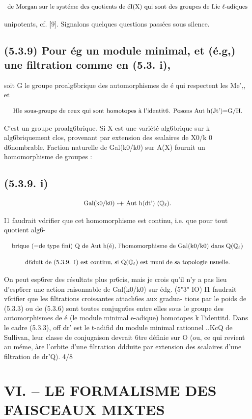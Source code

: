 \documentclass[11pt]{article}
\theoremstyle{remark}
\begin{document}
\[\text{\small de Morgan sur le systéme des quotients de éI(X) qui sont des groupes de Lie \(\ell\)-adiques}\]

unipotents, cf. [9]. Signalons quelques questions passées sous silence.

\subsection*{(5.3.9) Pour ég un module minimal, et (é.g,) une filtration comme en (5.3. i),}

soit G le groupe proalg6brique des automorphismes de é qui respectent les Me',, et

\[\text{\small Hle sous-groupe de ceux qui sont homotopes à l'identit6. Posons Aut h(Jt')=G/H.}\]

C'est un groupe proalg6brique. Si X est une variété alg6brique sur k alg6briquement clos, provenant par extension des sealaires de X0/k 0 d6nombrable, Faction naturelle de Gal(k0/k0) sur A(X) fournit un homomorphisme de groupes :

\subsection*{(5.3.9. i)}

\[\text{\small Gal(k0/k0) -+ Aut h(dt') (\(\mathbb{Q}_{\ell}\)).}\]

I1 faudrait vdrifier que cet homomorphisme est continu, i.e. que pour tout quotient alg6-

\[\text{\small brique (=de type fini) Q de Aut h(é), l'homomorphisme de Gal(k0/k0) dans Q(\(\mathbb{Q}_{\ell}\))}\]

\[\text{\small d6duit de (5.3.9. I) est continu, si Q(\(\mathbb{Q}_{\ell}\)) est muni de sa topologie usuelle.}\]

On peut esp6rer des résultats plus pr6cis, mais je crois qu'il n'y a pas lieu d'esp6rer une action raisonnable de Gal(k0/k0) sur édg. (5"3" IO) I1 faudrait v6rifier que les filtrations croissantes attach6es aux gradua- tions par le poids de (5.3.3) ou de (5.3.6) sont toutes conjugu6es entre elles sous le groupe des automorphismes de é (le module minimal e-adique) homotopes k l'identitd. Dans le cadre (5.3.3), off dr' est le t-adifid du module minimal rationnel ..KcQ de Sullivan, leur classe de conjugaison devrait 6tre définie sur O (ou, ce qui revient au méme, àre l'orbite d'une filtration ddduite par extension des scalaires d'une filtration de dr'Q). 4/8

\section*{VI. -- LE FORMALISME DES FAISCEAUX MIXTES}
\end{document}
